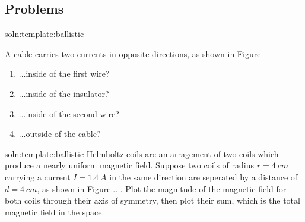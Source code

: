 \subsection{Problems}
\begin{problem}{soln:template:ballistic}{\label{prob:template:ballistic} 
A cable carries two currents in opposite directions, as shown in Figure %
\begin{enumerate}[label=\alph*),topsep=-10pt]
	\item ...inside of the first wire?
	\item ...inside of the insulator?
	\item ...inside of the second wire?
	\item ...outside of the cable?
\end{enumerate}
}
\end{problem}

\begin{problem}{soln:template:ballistic}{\label{prob:template:ballistic} 
		Helmholtz coils are an arragement of two coils which produce a nearly uniform magnetic field. Suppose two coils of radius $r = \SI{4}{cm}$ carrying a current $I = \SI{1.4}{A}$ in the same direction are seperated by a distance of $d = \SI{4}{cm}$, as shown in Figure... . Plot the magnitude of the magnetic field for both coils through their axis of symmetry, then plot their sum, which is the total magnetic field in the space.
	}
\end{problem}

\newpage
